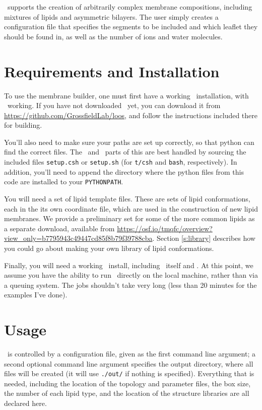 \documentclass[12pt]{article}
\begin{document}
\omgwtf\ supports the creation of arbitrarily complex membrane compositions,
including mixtures of lipids and asymmetric bilayers.  The user simply
creates a configuration file that specifies the segments to be included and
which leaflet they should be found in, as well as the number of ions and
water molecules.

\section{Requirements and Installation}
\label{s:install}

To use the membrane builder, one must first have a working \loos\ installation,
with \pyloos\ working.  If you have not downloaded \loos\ yet, you can download
it from \url{https://github.com/GrossfieldLab/loos}, and follow the instructions
included there for building.

You'll also need to make sure your paths are set up correctly, so that python
can find the correct files.  The \loos\ and \pyloos\ parts of this are best
handled by sourcing the included files {\tt setup.csh} or {\tt setup.sh} (for
{\tt t/csh} and {\tt bash}, respectively).  In addition, you'll need to
append the directory where the python files from this code are installed to
your {\tt PYTHONPATH}.

You will need a set of lipid template files.  These are sets of
lipid conformations, each in the its own coordinate file, which are used in
the construction of new lipid membranes.  We provide a preliminary set for
some of the more common lipids as a separate download, available from
\url{https://osf.io/tmqfc/overview?view_only=b7795943c49447cd85f8b79f39788cba}.
  Section \ref{s:library} describes
how you could go about making your own library of lipid conformations.

Finally, you will need a working \namd\ install, including \namd\ itself and
\psfgen.  At this point, we assume you have the ability to run \namd\
directly on the local machine, rather than via a queuing system.  The jobs
shouldn't take very long (less than 20 minutes for the examples I've done).

\section{Usage}
\label{s:usage}

\omgwtf\ is controlled by a configuration file, given as the first command
line argument; a second optional command line argument specifies the output
directory, where all files will be created (it will use {\tt ./out/} if
nothing is specified).  Everything that is needed, including the location of
the topology and parameter files, the box size, the number of each lipid
type, and the location of the structure libraries are all declared here.
\end{document}
